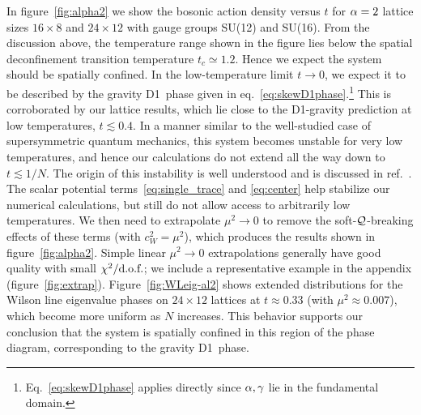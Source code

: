 In figure~\ref{fig:alpha2} we show the bosonic action density versus $t$ for $\alpha = 2$ lattice sizes $16\times 8$ and $24\times 12$ with gauge groups SU(12) and SU(16).
From the discussion above, the temperature range shown in the figure lies below the spatial deconfinement transition temperature $t_c \simeq 1.2$.
Hence we expect the system should be spatially confined.
In the low-temperature limit $t \to 0$, we expect it to be described by the gravity D1~phase given in eq.~\eqref{eq:skewD1phase}.\footnote{Eq.~\eqref{eq:skewD1phase} applies directly since $\alpha, \gamma$ lie in the fundamental domain.}
This is corroborated by our lattice results, which lie close to the D1-gravity prediction at low temperatures, $t \lesssim 0.4$.
In a manner similar to the well-studied case of supersymmetric quantum mechanics, this system becomes unstable for very low temperatures, and hence our calculations do not extend all the way down to $t \lesssim 1 / N$.
The origin of this instability is well understood and is discussed in ref.~\cite{Catterall:2009xn}.
The scalar potential terms~\eqref{eq:single_trace} and \eqref{eq:center} help stabilize our numerical calculations, but still do not allow access to arbitrarily low temperatures.
We then need to extrapolate $\mu^2 \to 0$ to remove the soft-$\mathcal Q$-breaking effects of these terms (with $c_W^2 = \mu^2$), which produces the results shown in figure~\ref{fig:alpha2}.
Simple linear $\mu^2 \to 0$ extrapolations generally have good quality with small $\mbox{$\chi^2/\text{d.o.f.}$}$; we include a representative example in the appendix (figure~\ref{fig:extrap}).
Figure~\ref{fig:WLeig-al2} shows extended distributions for the Wilson line eigenvalue phases on $24\times 12$ lattices at $t \approx 0.33$ (with $\mu^2 \approx 0.007$), which become more uniform as $N$ increases.
This behavior supports our conclusion that the system is spatially confined in this region of the phase diagram, corresponding to the gravity D1~phase.

